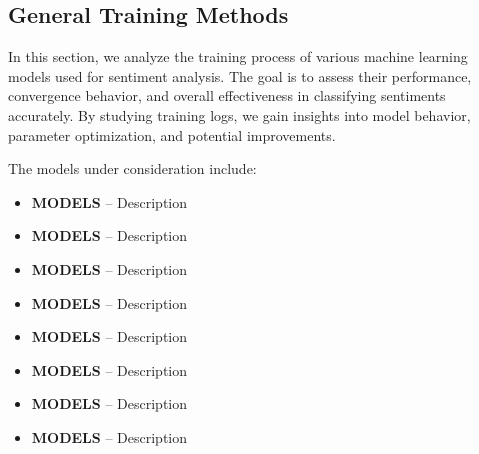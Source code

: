 \subsection{General Training Methods}

In this section, we analyze the training process of various machine learning models used for sentiment analysis. The goal is to assess their performance, convergence behavior, and overall effectiveness in classifying sentiments accurately. By studying training logs, we gain insights into model behavior, parameter optimization, and potential improvements.

The models under consideration include:
\begin{itemize}
    \item \textbf{MODELS} – Description
    \item \textbf{MODELS} – Description
    \item \textbf{MODELS} – Description
    \item \textbf{MODELS} – Description
    \item \textbf{MODELS} – Description
    \item \textbf{MODELS} – Description
    \item \textbf{MODELS} – Description
    \item \textbf{MODELS} – Description
\end{itemize}

